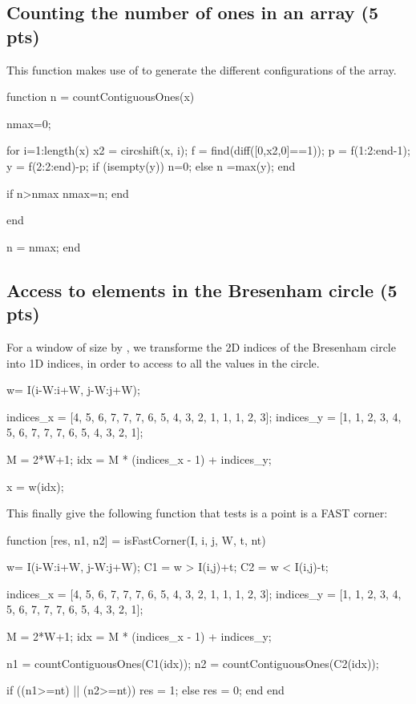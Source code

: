 \def\QRCODE{TB_IPR_EXAM.2018_up2_pratique_matlabqrcode.png}
\def\QRPAGE{http://www.iptutorials.science/tree/master/TB_IPR/EXAM.2018/up2_pratique_matlab}

\subsection{Counting the number of ones in an array (5 pts)}
This function makes use of  to generate the different configurations of the array.
\begin{matlab}
function n = countContiguousOnes(x)

nmax=0;

for i=1:length(x)
    x2 = circshift(x, i);
    f = find(diff([0,x2,0]==1));
    p = f(1:2:end-1);  %
    y = f(2:2:end)-p;  %
    if (isempty(y))
        n=0;
    else
        n =max(y);
    end
    
    if n>nmax
        nmax=n;
    end
    
end

n = nmax;
end
\end{matlab}

\subsection{Access to elements in the Bresenham circle (5 pts)}
For a window  of size  by , we transforme the 2D indices of the Bresenham circle into 1D indices, in order to access to all the values in the circle.
\begin{matlab}
w= I(i-W:i+W, j-W:j+W);

indices_x = [4, 5, 6, 7, 7, 7, 6, 5, 4, 3, 2, 1, 1, 1, 2, 3];
indices_y = [1, 1, 2, 3, 4, 5, 6, 7, 7, 7, 6, 5, 4, 3, 2, 1];

M = 2*W+1;
idx = M * (indices_x - 1) + indices_y;

x = w(idx);
\end{matlab}

This finally give the following function that tests is a point is a FAST corner:
\begin{matlab}
function [res, n1, n2] = isFastCorner(I, i, j, W, t, nt)

w= I(i-W:i+W, j-W:j+W);
C1 = w > I(i,j)+t;
C2 = w < I(i,j)-t;

indices_x = [4, 5, 6, 7, 7, 7, 6, 5, 4, 3, 2, 1, 1, 1, 2, 3];
indices_y = [1, 1, 2, 3, 4, 5, 6, 7, 7, 7, 6, 5, 4, 3, 2, 1];

M = 2*W+1;
idx = M * (indices_x - 1) + indices_y;

n1 = countContiguousOnes(C1(idx));
n2 = countContiguousOnes(C2(idx));

if ((n1>=nt) || (n2>=nt))
    res = 1;
else
    res = 0;
end
end

\end{matlab}

